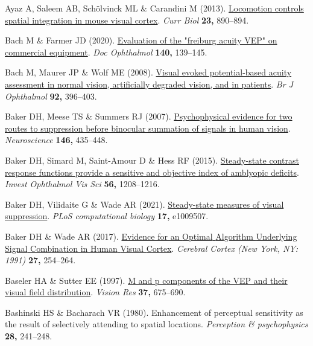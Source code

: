 \documentclass[
  letterpaper,
  DIV=11,
  numbers=noendperiod]{scrartcl}
\newlength{\cslhangindent}
\newenvironment{CSLReferences}[2] %
 {\begin{list}{}{%
  \setlength{\itemindent}{0pt}
  \setlength{\leftmargin}{0pt}
  \setlength{\parsep}{0pt}
  \ifodd #1
   \setlength{\leftmargin}{\cslhangindent}
   \setlength{\itemindent}{-1\cslhangindent}
  \fi
  \setlength{\itemsep}{#2\baselineskip}}}
 {\end{list}}
\begin{document}
\begin{CSLReferences}{1}{1}
Ayaz A, Saleem AB, Schölvinck ML \& Carandini M (2013).
\href{https://doi.org/10.1016/j.cub.2013.04.012}{Locomotion controls
spatial integration in mouse visual cortex}. \emph{Curr Biol}
\textbf{23,} 890--894.

Bach M \& Farmer JD (2020).
\href{https://doi.org/10.1007/s10633-019-09726-2}{Evaluation of the
"freiburg acuity VEP" on commercial equipment}. \emph{Doc Ophthalmol}
\textbf{140,} 139--145.

Bach M, Maurer JP \& Wolf ME (2008).
\href{https://doi.org/10.1136/bjo.2007.130245}{Visual evoked
potential-based acuity assessment in normal vision, artificially
degraded vision, and in patients}. \emph{Br J Ophthalmol} \textbf{92,}
396--403.

Baker DH, Meese TS \& Summers RJ (2007).
\href{https://doi.org/10.1016/j.neuroscience.2007.01.030}{Psychophysical
evidence for two routes to suppression before binocular summation of
signals in human vision}. \emph{Neuroscience} \textbf{146,} 435--448.

Baker DH, Simard M, Saint-Amour D \& Hess RF (2015).
\href{https://doi.org/10.1167/iovs.14-15611}{Steady-state contrast
response functions provide a sensitive and objective index of amblyopic
deficits}. \emph{Invest Ophthalmol Vis Sci} \textbf{56,} 1208--1216.

Baker DH, Vilidaite G \& Wade AR (2021).
\href{https://doi.org/10.1371/journal.pcbi.1009507}{Steady-state
measures of visual suppression}. \emph{PLoS computational biology}
\textbf{17,} e1009507.

Baker DH \& Wade AR (2017).
\href{https://doi.org/10.1093/cercor/bhw395}{Evidence for an {Optimal}
{Algorithm} {Underlying} {Signal} {Combination} in {Human} {Visual}
{Cortex}}. \emph{Cerebral Cortex (New York, NY: 1991)} \textbf{27,}
254--264.

Baseler HA \& Sutter EE (1997).
\href{https://doi.org/10.1016/s0042-6989(96)00209-x}{M and p components
of the VEP and their visual field distribution}. \emph{Vision Res}
\textbf{37,} 675--690.

Bashinski HS \& Bacharach VR (1980). Enhancement of perceptual
sensitivity as the result of selectively attending to spatial locations.
\emph{Perception \& psychophysics} \textbf{28,} 241--248.


\end{CSLReferences}
\end{document}
